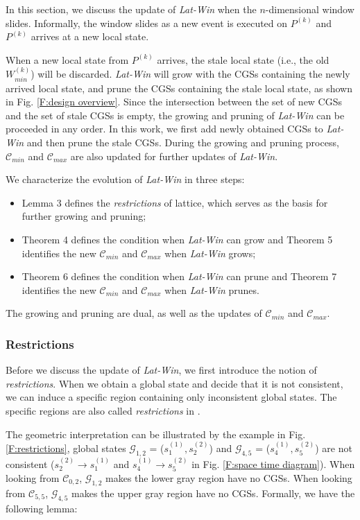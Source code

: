 \documentclass[12pt,journal,letterpaper,compsoc]{IEEEtran}
\begin{document}
In this section, we discuss the update of {\it Lat-Win} when the $n$-dimensional window slides. Informally, the window slides as a new event is executed on $P^{(k)}$ and $P^{(k)}$ arrives at a new local state.

When a new local state from $P^{(k)}$ arrives, the stale local state (i.e., the old $W^{(k)}_{min}$) will be discarded. {\it Lat-Win} will grow with the CGSs containing the newly arrived local state, and prune the CGSs containing the stale local state, as shown in Fig. \ref{F:design overview}. Since the intersection between the set of new CGSs and the set of stale CGSs is empty, the growing and pruning of {\it Lat-Win} can be proceeded in any order. In this work, we first add newly obtained CGSs to {\it Lat-Win} and then prune the stale CGSs. During the growing and pruning process, $\mathcal{C}_{min}$ and $\mathcal{C}_{max}$ are also updated for further updates of {\it Lat-Win}.

We characterize the evolution of {\it Lat-Win} in three steps:
\begin{itemize}
    \item Lemma 3 defines the {\it restrictions} of lattice, which serves as the basis for further growing and pruning;
    \item Theorem 4 defines the condition when {\it Lat-Win} can grow and Theorem 5 identifies the new $\mathcal{C}_{min}$ and $\mathcal{C}_{max}$ when {\it Lat-Win} grows;
    \item Theorem 6 defines the condition when {\it Lat-Win} can prune and Theorem 7 identifies the new $\mathcal{C}_{min}$ and $\mathcal{C}_{max}$ when {\it Lat-Win} prunes.
\end{itemize}

\noindent The growing and pruning are dual, as well as the updates of $\mathcal{C}_{min}$ and $\mathcal{C}_{max}$.

\subsubsection{Restrictions}

Before we discuss the update of {\it Lat-Win}, we first introduce the notion of {\it restrictions}. When we obtain a global state and decide that it is not consistent, we can induce a specific region containing only inconsistent global states. The specific regions are also called {\it restrictions} in \cite{Mattern89}.

The geometric interpretation can be illustrated by the example in Fig. \ref{F:restrictions}, global states $\mathcal{G}_{1,2}$ = ($s^{(1)}_{1}, s^{(2)}_{2}$) and $\mathcal{G}_{4,5}$ = ($s^{(1)}_{4}, s^{(2)}_{5}$) are not consistent ($s^{(2)}_{2} \rightarrow s^{(1)}_{1}$ and $s^{(1)}_{4} \rightarrow s^{(2)}_{5}$ in Fig. \ref{F:space time diagram}). When looking from $\mathcal{C}_{0,2}$, $\mathcal{G}_{1,2}$ makes the lower gray region have no CGSs. When looking from $\mathcal{C}_{5,5}$, $\mathcal{G}_{4,5}$ makes the upper gray region have no CGSs. Formally, we have the following lemma: \\
\end{document}

